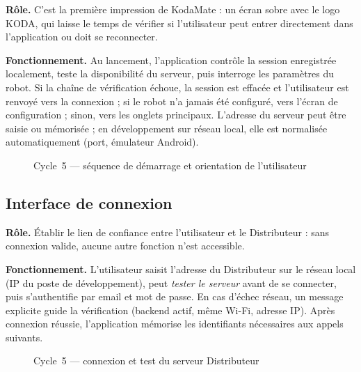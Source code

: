 \documentclass[a4paper,12pt]{report}
\begin{document}
	\textbf{Rôle.} C'est la première impression de KodaMate : un écran sobre avec
	le logo KODA, qui laisse le temps de vérifier si l'utilisateur peut entrer
	directement dans l'application ou doit se reconnecter.
	
	\textbf{Fonctionnement.} Au lancement, l'application contrôle la session
	enregistrée localement, teste la disponibilité du serveur, puis interroge les
	paramètres du robot. Si la chaîne de vérification échoue, la session est
	effacée et l'utilisateur est renvoyé vers la connexion ; si le robot n'a
	jamais été configuré, vers l'écran de configuration ; sinon, vers les onglets
	principaux. L'adresse du serveur peut être saisie ou mémorisée ; en
	développement sur réseau local, elle est normalisée automatiquement (port,
	émulateur Android).
	
	\begin{figure}[H]
		\centering
		\caption{Cycle~5 --- séquence de démarrage et orientation de l'utilisateur}
		\label{fig:ch5-seq-bootstrap}
	\end{figure}
	
	
	\subsection{Interface de connexion}
	
	\textbf{Rôle.} Établir le lien de confiance entre l'utilisateur et le
	Distributeur : sans connexion valide, aucune autre fonction n'est accessible.
	
	\textbf{Fonctionnement.} L'utilisateur saisit l'adresse du Distributeur sur le
	réseau local (IP du poste de développement), peut \emph{tester le serveur}
	avant de se connecter, puis s'authentifie par email et mot de passe. En cas
	d'échec réseau, un message explicite guide la vérification (backend actif,
	même Wi-Fi, adresse IP). Après connexion réussie, l'application mémorise les
	identifiants nécessaires aux appels suivants.
	
	\begin{figure}[H]
		\centering
		\caption{Cycle~5 --- connexion et test du serveur Distributeur}
		\label{fig:ch5-ecran-login}
	\end{figure}
	
\end{document}
